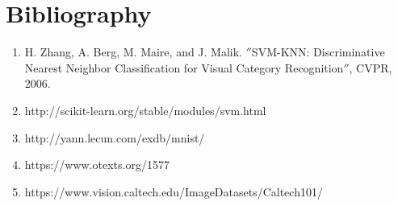 \documentclass[11pt]{article}
\begin{document}
\section{Bibliography}
\begin{enumerate}[(1)]
\item  H. Zhang, A. Berg, M. Maire, and J. Malik. $''$SVM-KNN: Discriminative Nearest Neighbor Classification for Visual Category Recognition$''$, CVPR, 2006.

\item http://scikit-learn.org/stable/modules/svm.html

\item http://yann.lecun.com/exdb/mnist/

\item https://www.otexts.org/1577

\item https://www.vision.caltech.edu/Image\textunderscore Datasets/Caltech101/


\end{enumerate}
\end{document}
